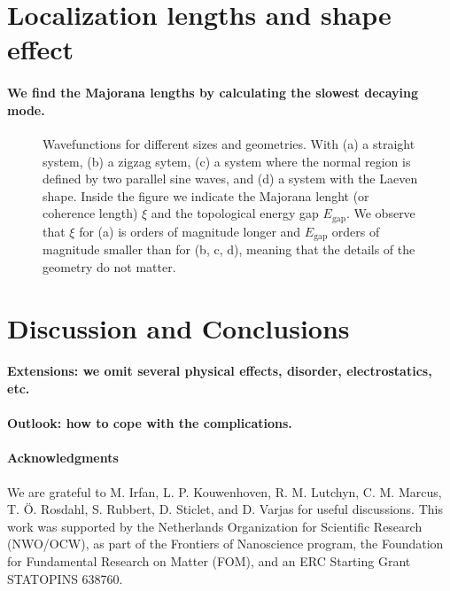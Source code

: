 \documentclass[english, twocolumn, 10pt, aps, superscriptaddress, floatfix, prb, citeautoscript]{revtex4-1}
\renewcommand{\comment}[2]{#2}
\renewcommand{\comment}{\paragraph}
\begin{document}
\section{Localization lengths and shape effect}

\comment{We find the Majorana lengths by calculating the slowest decaying mode.}

\begin{figure}
\caption{Wavefunctions for different sizes and geometries.
With (a) a straight system, (b) a zigzag sytem, (c) a system where the normal region is defined by two parallel sine waves, and (d) a system with the Laeven shape.
Inside the figure we indicate the Majorana lenght (or coherence length) $\xi$ and the topological energy gap $E_\textrm{gap}.$
We observe that $\xi$ for (a) is orders of magnitude longer and $E_\textrm{gap}$ orders of magnitude smaller than for (b, c, d), meaning that the details of the geometry do not matter.
\label{fig:wavefunctions}}
\end{figure}


\section{Discussion and Conclusions}

\comment{Extensions: we omit several physical effects, disorder, electrostatics, etc.}

\comment{Outlook: how to cope with the complications.}

\comment{Acknowledgments}

We are grateful to M. Irfan, L. P. Kouwenhoven, R. M. Lutchyn, C. M. Marcus, T. Ö. Rosdahl, S. Rubbert, D. Sticlet, and D. Varjas for useful discussions.
This work was supported by the Netherlands Organization for Scientific Research (NWO/OCW), as part of the Frontiers of Nanoscience program, the Foundation for Fundamental Research on Matter (FOM), and an ERC Starting Grant STATOPINS 638760.



\end{document}

